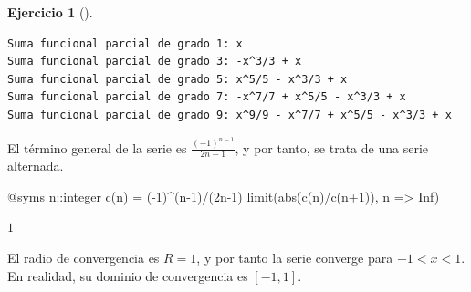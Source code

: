 \documentclass[
  a4paper,
]{scrreport}
\newenvironment{Shaded}{\begin{snugshade}}{\end{snugshade}}
\newcommand{\BuiltInTok}[1]{\textcolor[rgb]{0.00,0.23,0.31}{#1}}
\newcommand{\ConstantTok}[1]{\textcolor[rgb]{0.56,0.35,0.01}{#1}}
\newcommand{\ControlFlowTok}[1]{\textcolor[rgb]{0.00,0.23,0.31}{\textbf{#1}}}
\newcommand{\DataTypeTok}[1]{\textcolor[rgb]{0.68,0.00,0.00}{#1}}
\newcommand{\FloatTok}[1]{\textcolor[rgb]{0.68,0.00,0.00}{#1}}
\newcommand{\FunctionTok}[1]{\textcolor[rgb]{0.28,0.35,0.67}{#1}}
\newcommand{\ImportTok}[1]{\textcolor[rgb]{0.00,0.46,0.62}{#1}}
\newcommand{\NormalTok}[1]{\textcolor[rgb]{0.00,0.23,0.31}{#1}}
\newcommand{\OperatorTok}[1]{\textcolor[rgb]{0.37,0.37,0.37}{#1}}
\newcommand{\PreprocessorTok}[1]{\textcolor[rgb]{0.68,0.00,0.00}{#1}}
\newcommand{\SpecialCharTok}[1]{\textcolor[rgb]{0.37,0.37,0.37}{#1}}
\newcommand{\StringTok}[1]{\textcolor[rgb]{0.13,0.47,0.30}{#1}}
\theoremstyle{definition}
\newtheorem{exercise}{Ejercicio}[chapter]
\theoremstyle{remark}
\begin{document}
\begin{exercise}[]
\begin{tcolorbox}
\begin{Shaded}
\end{Shaded}

\begin{verbatim}
Suma funcional parcial de grado 1: x
Suma funcional parcial de grado 3: -x^3/3 + x
Suma funcional parcial de grado 5: x^5/5 - x^3/3 + x
Suma funcional parcial de grado 7: -x^7/7 + x^5/5 - x^3/3 + x
Suma funcional parcial de grado 9: x^9/9 - x^7/7 + x^5/5 - x^3/3 + x
\end{verbatim}

El término general de la serie es \(\frac{(-1)^{n-1}}{2n-1}\), y por
tanto, se trata de una serie alternada.

\begin{Shaded}
\begin{Highlighting}[]
\PreprocessorTok{@syms}\NormalTok{ n}\OperatorTok{::}\DataTypeTok{integer}
\FunctionTok{c}\NormalTok{(n) }\OperatorTok{=}\NormalTok{ (}\OperatorTok{{-}}\FloatTok{1}\NormalTok{)}\OperatorTok{\^{}}\NormalTok{(n}\OperatorTok{{-}}\FloatTok{1}\NormalTok{)}\OperatorTok{/}\NormalTok{(}\FloatTok{2}\NormalTok{n}\OperatorTok{{-}}\FloatTok{1}\NormalTok{)}
\FunctionTok{limit}\NormalTok{(}\FunctionTok{abs}\NormalTok{(}\FunctionTok{c}\NormalTok{(n)}\OperatorTok{/}\FunctionTok{c}\NormalTok{(n}\OperatorTok{+}\FloatTok{1}\NormalTok{)), n }\OperatorTok{=\textgreater{}} \ConstantTok{Inf}\NormalTok{)}
\end{Highlighting}
\end{Shaded}

$1$

El radio de convergencia es \(R=1\), y por tanto la serie converge para
\(-1<x<1\). En realidad, su dominio de convergencia es \([-1,1]\).


\end{tcolorbox}
\end{exercise}
\end{document}
